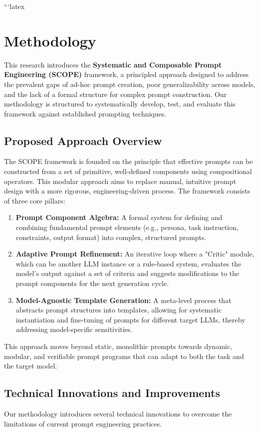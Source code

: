\documentclass{article}
\begin{document}
```latex
\section{Methodology}
This research introduces the \textbf{Systematic and Composable Prompt Engineering (SCOPE)} framework, a principled approach designed to address the prevalent gaps of ad-hoc prompt creation, poor generalizability across models, and the lack of a formal structure for complex prompt construction. Our methodology is structured to systematically develop, test, and evaluate this framework against established prompting techniques.

\subsection{Proposed Approach Overview}
The SCOPE framework is founded on the principle that effective prompts can be constructed from a set of primitive, well-defined components using compositional operators. This modular approach aims to replace manual, intuitive prompt design with a more rigorous, engineering-driven process. The framework consists of three core pillars:

\begin{enumerate}
    \item \textbf{Prompt Component Algebra:} A formal system for defining and combining fundamental prompt elements (e.g., persona, task instruction, constraints, output format) into complex, structured prompts.
    \item \textbf{Adaptive Prompt Refinement:} An iterative loop where a "Critic" module, which can be another LLM instance or a rule-based system, evaluates the model's output against a set of criteria and suggests modifications to the prompt components for the next generation cycle.
    \item \textbf{Model-Agnostic Template Generation:} A meta-level process that abstracts prompt structures into templates, allowing for systematic instantiation and fine-tuning of prompts for different target LLMs, thereby addressing model-specific sensitivities.
\end{enumerate}

This approach moves beyond static, monolithic prompts towards dynamic, modular, and verifiable prompt programs that can adapt to both the task and the target model.

\subsection{Technical Innovations and Improvements}
Our methodology introduces several technical innovations to overcome the limitations of current prompt engineering practices.
\end{document}
